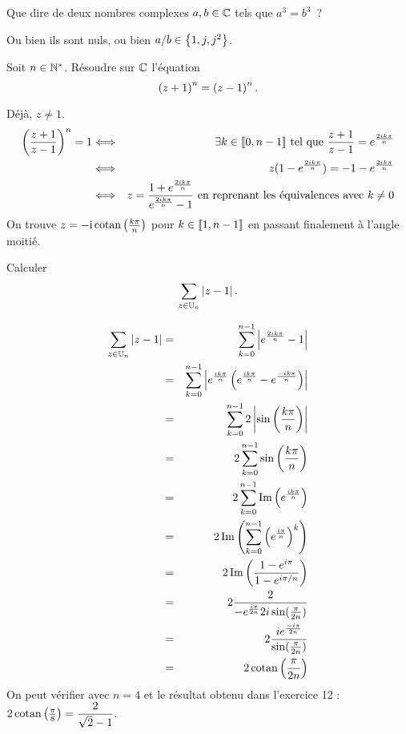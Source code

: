 \documentclass{magnoliaold}
\begin{document}
\begin{exos}
\exo Que dire de deux nombres complexes $a,b\in\mathbb{C}$ tels que $a^3=b^3$~?

\begin{sol}
Ou bien ils sont nuls, ou bien $a/b \in \left\{1,j,j^2\right\}$.
\end{sol}
\exo Soit $n\in{\mathbb{N}^*}$. Résoudre sur $\mathbb{C}$ l'équation
  \[\left(z+1\right)^n=\left(z-1\right)^n.\]
  \begin{sol}
  Déjà, $z\neq 1$.
  \begin{eqnarray*}
  \left(\frac{z+1}{z-1}\right)^n=1 &\Longleftrightarrow & \exists k\in \llbracket 0,n-1\rrbracket\text{ tel que } \frac{z+1}{z-1}= e^{\frac{2ik\pi}{n}}\\
  &\Longleftrightarrow & z(1-e^{\frac{2ik\pi}{n}})=-1-e^{\frac{2ik\pi}{n}}\\
  &\Longleftrightarrow & z=\frac{1+e^{\frac{2ik\pi}{n}}}{e^{\frac{2ik\pi}{n}}-1} \text{ en reprenant les équivalences avec }k\neq 0
  \end{eqnarray*}
  On trouve $z=-{\rm i}\operatorname{cotan}\left(\frac{k\pi}{n}\right)$ pour $k\in\left\llbracket 1,n-1\right\rrbracket$ en passant finalement à l'angle moitié.
  \end{sol}

\exo Calculer
  \[\sum_{z\in\U[n]} \abs{z-1}.\]
  \begin{sol}
\begin{eqnarray*}
  \sum_{z\in\U[n]} \abs{z-1}&=& \sum_{k=0}^{n-1} \abs{e^{\frac{2ik\pi}{n}}-1}\\
  &=& \sum_{k=0}^{n-1} \abs{e^{\frac{ik\pi}{n}}\p{e^{\frac{ik\pi}{n}}-e^{\frac{-ik\pi}{n}}}}\\
  &=& \sum_{k=0}^{n-1}2\abs{\sin\p{\frac{k\pi}{n}}}\\
  &=& 2\sum_{k=0}^{n-1}\sin\p{\frac{k\pi}{n}}\\
  &=& 2\sum_{k=0}^{n-1}\Im\p{e^{\frac{ik\pi}{n}}}\\
  &=& 2\Im\p{\sum_{k=0}^{n-1}\p{e^{\frac{i\pi}{n}}}^k}\\
  &=& 2\Im\p{\frac{1-e^{i\pi}}{1-e^{i\pi/n}}}\\
  &=& 2\frac{2}{-e^{\frac{i\pi}{2n}}2i\sin(\frac{\pi}{2n})}\\
  &=& 2\frac{ie^{\frac{-i\pi}{2n}}}{\sin(\frac{\pi}{2n})}\\
  &=& 2\cotan\p{\frac{\pi}{2n}}
\end{eqnarray*}
  On peut vérifier avec $n=4$ et le résultat obtenu dans l'exercice 12 :  $2\operatorname{cotan}\left(\frac{\pi}{8}\right)=\dfrac{2}{\sqrt{2}-1}$.
  \end{sol}
\end{exos}
\end{document}
